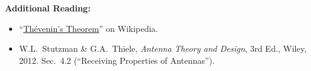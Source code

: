 
{\bf Additional Reading:}
\begin{itemize}
\item ``\href{https://en.wikipedia.org/wiki/Th%C3%A9venin%27s_theorem}{Th\'{e}venin's Theorem}'' on Wikipedia.
\item W.L.~Stutzman \& G.A.~Thiele, \emph{Antenna Theory and Design}, 3rd Ed., Wiley, 2012.  Sec.~4.2 (``Receiving Properties of Antennas'').
\end{itemize}



